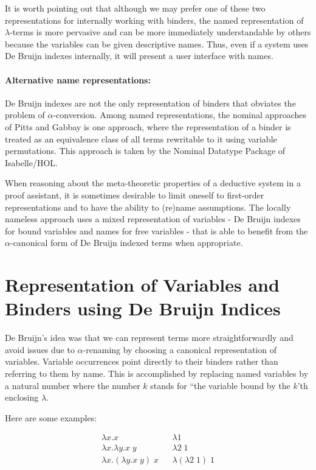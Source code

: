 It is worth pointing out that although we may prefer one of these two
representations for internally working with binders, the named representation of $\lambda$-terms is more pervasive and can be more immediately understandable by others because the variables can be given descriptive names. Thus, even if a system uses De Bruijn indexes internally, it will present a user interface with names.


\paragraph{Alternative name representations:}
De Bruijn indexes are not the only representation of binders that
obviates the problem of $\alpha$-conversion. Among named
representations, the nominal approaches of Pitts and Gabbay
\cite{Gabbay:LICS99} is one approach, where the representation of a
binder is treated as an equivalence class of all terms rewritable to
it using variable permutations. This approach is taken by the Nominal
Datatype Package of Isabelle/HOL. 

When reasoning about the meta-theoretic properties of a deductive
system in a proof assistant, it is sometimes desirable to limit
oneself to first-order representations and to have the ability to
(re)name assumptions. The locally nameless approach
\cite{Aydemir:POPL08} uses a mixed representation of variables - De Bruijn indexes for bound variables and
names for free variables - that is able to benefit from the
$\alpha$-canonical form of De Bruijn indexed terms when appropriate.


\section{Representation of Variables and Binders using De Bruijn Indices}

De Bruijn's idea was that we can represent terms more
straightforwardly and avoid issues due to $\alpha$-renaming by
choosing a canonical representation of variables. Variable occurrences
point directly to their binders rather than referring to them by
name. This is accomplished by replacing named variables by a natural
number where the number $k$ stands for ``the variable bound by the
$k$'th enclosing $\lambda$. 

Here are some examples:

\[
\begin{array}{lcl}
\lambda x. x  & & \lambda 1 \\
\lambda x. \lambda y . x\;y & & \lambda 2\; 1\\
\lambda x. (\lambda y. x \; y)\; x & & \lambda (\lambda 2\;1) \;1 
\end{array}
\]

